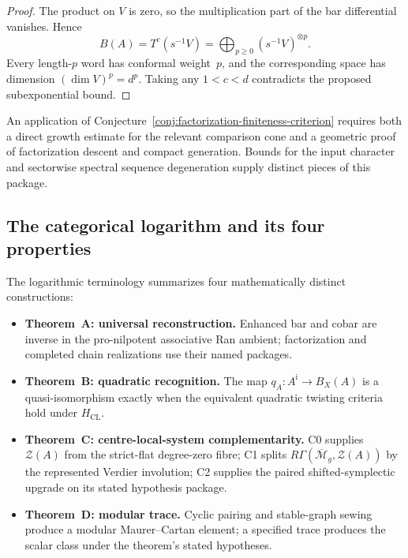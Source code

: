 \begin{proof}
The product on $V$ is zero, so the multiplication part of the bar
differential vanishes.  Hence
\[
 B(A)=T^c(s^{-1}V)
 =\bigoplus_{p\geq0}(s^{-1}V)^{\otimes p}.
\]
Every length-$p$ word has conformal weight~$p$, and the corresponding
space has dimension $(\dim V)^p=d^p$.  Taking any
$1<c<d$ contradicts the proposed subexponential bound.
\end{proof}

\begin{corollary}\label{cor:finiteness-criterion-reduction}
An application of
Conjecture~\textup{\ref{conj:factorization-finiteness-criterion}}
requires both a direct growth estimate for the relevant comparison
cone and a geometric proof of factorization descent and compact
generation.  Bounds for the input character and sectorwise spectral
sequence degeneration supply distinct pieces of this package.
\end{corollary}

\subsection{The categorical logarithm and its four properties}
\label{subsec:monograph-as-log}

The logarithmic terminology summarizes four mathematically distinct
constructions:
\begin{itemize}
\item \textbf{Theorem~A: universal reconstruction.} Enhanced bar and
cobar are inverse in the pro-nilpotent associative Ran ambient;
factorization and completed chain realizations use their named
packages.
\item \textbf{Theorem~B: quadratic recognition.} The map
$q_A\colon A^{\mathrm i}\to B_X(A)$ is a quasi-isomorphism exactly
when the equivalent quadratic twisting criteria hold under
$H_{\mathrm{CL}}$.
\item \textbf{Theorem~C: centre-local-system complementarity.} C0
supplies~$\mathcal Z(A)$ from the strict-flat degree-zero fibre; C1
splits
$R\Gamma(\overline{\mathcal M}_g,\mathcal Z(A))$ by the represented
Verdier involution; C2 supplies the paired shifted-symplectic upgrade
on its stated hypothesis package.
\item \textbf{Theorem~D: modular trace.} Cyclic pairing and
stable-graph sewing produce a modular Maurer--Cartan element; a
specified trace produces the scalar class under the theorem's stated
hypotheses.
\end{itemize}

